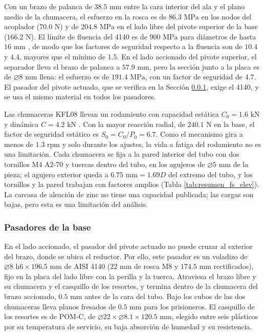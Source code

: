 \documentclass[../../General.tex]{subfiles}
\begin{document}
Con un brazo de palanca de $38.5\text{ mm}$ entre la cara interior del ala y el plano medio de la chumacera, el esfuerzo en la rosca es de $86.3\text{ MPa}$ en los nodos del acoplador ($70.0\text{ N}$) y de $204.8\text{ MPa}$ en el lado libre del pivote superior de la base ($166.2\text{ N}$). El límite de fluencia del 4140 es de $900\text{ MPa}$ para diámetros de hasta $16\text{ mm}$ \citep{europer_4140}, de modo que los factores de seguridad respecto a la fluencia son de $10.4$ y $4.4$, mayores que el mínimo de $1.5$. En el lado accionado del pivote superior, el separador lleva el brazo de palanca a $57.9\text{ mm}$, pero la sección junto a la placa es de $\varnothing 8\text{ mm}$ llena: el esfuerzo es de $191.4\text{ MPa}$, con un factor de seguridad de $4.7$. El pasador del pivote actuado, que se verifica en la Sección \ref{subsubsec:pasador_base_elev}, exige el 4140, y se usa el mismo material en todos los pasadores.

Las chumaceras KFL08 llevan un rodamiento con capacidad estática $C_0 = 1.6\text{ kN}$ y dinámica $C = 4.2\text{ kN}$ \citep{madler_kfl08}. Con la mayor reacción radial, de $240.1\text{ N}$ en la base, el factor de seguridad estático es $S_0 = C_0/P_0 = 6.7$. Como el mecanismo gira a menos de $1.3\text{ rpm}$ y solo durante los ajustes, la vida a fatiga del rodamiento no es una limitación. Cada chumacera se fija a la pared interior del tubo con dos tornillos M4 A2-70 y tuercas dentro del tubo, en los agujeros de $\varnothing 5\text{ mm}$ de la pieza; el agujero exterior queda a $6.75\text{ mm} = 1.69D$ del extremo del tubo, y los tornillos y la pared trabajan con factores amplios (Tabla \ref{tab:resumen_fs_elev}). La carcasa de aleación de zinc no tiene una capacidad publicada; las cargas son bajas, pero esta es una limitación del análisis.

\subsubsection{Pasadores de la base}\label{subsubsec:pasador_base_elev}

En el lado accionado, el pasador del pivote actuado no puede cruzar al exterior del brazo, donde se ubica el reductor. Por ello, este pasador es un voladizo de $\varnothing 8\text{ h6} \times 196.5\text{ mm}$ de AISI 4140 ($22\text{ mm}$ de rosca M8 y $174.5\text{ mm}$ rectificados), fijo en la placa del lado libre con la perilla y la tuerca. Atraviesa el brazo libre y su chumacera y el casquillo de los resortes, y termina dentro de la chumacera del brazo accionado, $0.5\text{ mm}$ antes de la cara del tubo. Bajo los cubos de las dos chumaceras lleva planos fresados de $0.5\text{ mm}$ para los prisioneros. El casquillo de los resortes es de POM-C, de $\varnothing 22 \times \varnothing 8.1 \times 120.5\text{ mm}$, elegido entre seis plásticos por su temperatura de servicio, su baja absorción de humedad y su resistencia.
\end{document}
